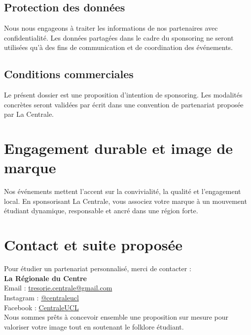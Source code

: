 \documentclass[11pt,a4paper]{scrartcl}
\begin{document}
\subsection{Protection des données}
Nous nous engageons à traiter les informations de nos partenaires avec confidentialité. Les données partagées dans le cadre du sponsoring ne seront utilisées qu'à des fins de communication et de coordination des événements.

\subsection{Conditions commerciales}
Le présent dossier est une proposition d'intention de sponsoring. Les modalités concrètes seront validées par écrit dans une convention de partenariat proposée par La Centrale.

\section{Engagement durable et image de marque}
Nos événements mettent l'accent sur la convivialité, la qualité et l'engagement local. En sponsorisant La Centrale, vous associez votre marque à un mouvement étudiant dynamique, responsable et ancré dans une région forte.

\section{Contact et suite proposée}
Pour étudier un partenariat personnalisé, merci de contacter :\\
\textbf{La Régionale du Centre}\\
Email : \href{mailto:tresorie.centrale@gmail.com}{tresorie.centrale@gmail.com}\\
Instagram : \href{https://www.instagram.com/centraleucl}{@centraleucl}\\
Facebook : \href{https://www.facebook.com/CentraleUCL}{CentraleUCL}\\[1em]
Nous sommes prêts à concevoir ensemble une proposition sur mesure pour valoriser votre image tout en soutenant le folklore étudiant.

\vspace{2em}
\end{document}
